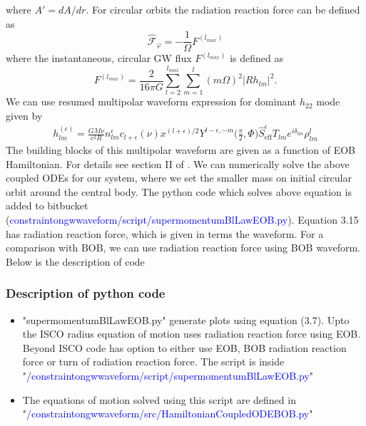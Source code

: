 \documentclass[prd,preprintnumbers,onecolumn,eqsecnum,floatfix,letter]{revtex4}
\begin{document}
where $A' = dA/dr$. For circular orbits the radiation reaction force can be defined as
\begin{equation}
	\hat{\mathscr{F}}_{\varphi} = -\frac{1}{\Omega}F^{(l_{max})}
\end{equation}
where the instantaneous, circular GW flux $F^{(l_{max})}$ is defined as
\begin{equation}
	F^{(l_{max})} = \frac{2}{16\pi G}\sum_{l=2}^{l_{max}}\sum_{m=1}^{l}\left(m\Omega\right)^{2} |Rh_{lm}|^2.
\end{equation}
We can use resumed multipolar waveform expression for dominant $h_{22}$ mode given by\cite{Damour_2009}
\begin{align}
	h_{lm}^{\left(\epsilon\right)} = \frac{GM\nu}{c^2 R}n_{lm}^{\epsilon}c_{l+\epsilon}\left(\nu\right)x^{\left(l+\epsilon\right)/2}Y^{l-\epsilon,-m}\bigg(\frac{\pi}{2}, \Phi\bigg)\hat{S}_{\text{eff}}^{\epsilon}T_{lm}e^{i\delta_{lm}}\rho_{lm}^l
	\label{hlm}
\end{align}
The building blocks of this multipolar waveform are given as a function of EOB Hamiltonian. For details see section II of \cite{Damour_2009}. We can numerically solve the above coupled ODEs for our system, where we set the smaller mass on initial circular orbit around the central body. The python code which solves above equation is added to bitbucket (\textcolor{blue}{constraintongwwaveform/script/supermomentumBlLawEOB.py}). Equation 3.15 has radiation reaction force, which is given in terms the waveform. For a comparison with BOB, we can use radiation reaction force using BOB waveform. Below is the description of code    
\subsubsection{Description of python code}
\begin{itemize}
\item "supermomentumBlLawEOB.py" generate plots using equation (3.7). Upto the ISCO radius equation of motion uses radiation reaction force using EOB. Beyond ISCO code has option to either use EOB, BOB radiation reaction force or turn of radiation reaction force. The script is inside "\textcolor{blue}{/constraintongwwaveform/script/supermomentumBlLawEOB.py}"
\item The equations of motion solved using this script are defined in "\textcolor{blue}{/constraintongwwaveform/src/HamiltonianCoupledODEBOB.py}" 
\end{itemize}
\end{document}
